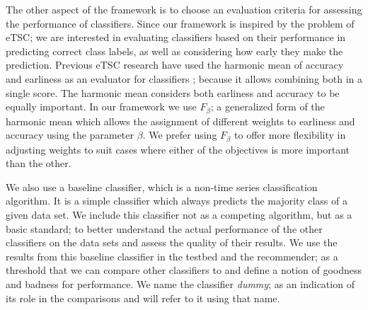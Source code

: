 The other aspect of the framework is to choose an evaluation criteria for assessing the performance of classifiers.
Since our framework is inspired by the problem of eTSC; we are interested in evaluating classifiers based on their performance in predicting correct class labels, as well as considering how early they make the prediction.
Previous eTSC research have used the harmonic mean of accuracy and earliness as an evaluator for classifiers \cite{schafer2020teaser}; because it allows combining both in a single score.
The harmonic mean considers both earliness and accuracy to be equally important.
In our framework we use $F_{\beta}$; a generalized form of the harmonic mean which allows the assignment of different weights to earliness and accuracy using the parameter $\beta$.
We prefer using $F_{\beta}$ to offer more flexibility in adjusting weights to suit cases where either of the objectives is more important than the other.

We also use a baseline classifier, which is a non-time series classification algorithm.
It is a simple classifier which always predicts the majority class of a given data set.
We include this classifier not as a competing algorithm, but as a basic standard; to better understand the actual performance of the other classifiers on the data sets and assess the quality of their results.
We use the results from this baseline classifier in the testbed and the recommender; as a threshold that we can compare other classifiers to and define a notion of goodness and badness for performance.
We name the classifier \emph{dummy}; as an indication of its role in the comparisons and will refer to it using that name.


